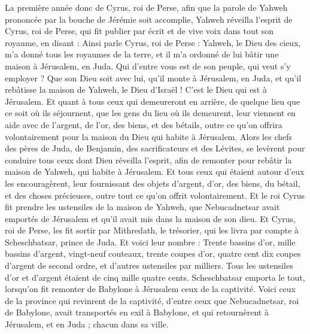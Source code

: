 \begin{multicols}{2}
\VerseOne{}La première année donc de Cyrus, roi de Perse, afin que la parole de Yahweh prononcée par la bouche de Jérémie soit accomplie,  Yahweh réveilla l'esprit de Cyrus, roi de Perse, qui fit publier par écrit et de vive voix dans tout son royaume, en disant :
Ainsi parle Cyrus, roi de Perse : Yahweh, le Dieu des cieux, m'a donné tous les royaumes de la terre, et il m'a ordonné de lui bâtir une maison à Jérusalem, en Juda.
Qui d'entre vous est de son peuple, qui veut s'y employer ? Que son Dieu soit avec lui, qu'il monte à Jérusalem, en Juda, et qu'il rebâtisse la maison de Yahweh, le Dieu d'Israël ! C'est le Dieu qui est à Jérusalem.
Et quant à tous ceux qui demeureront en arrière, de quelque lieu que ce soit où ils séjournent, que les gens du lieu où ils demeurent, leur viennent en aide avec de l'argent, de l’or, des biens, et des bétails, outre ce qu’on offrira volontairement pour la maison du Dieu qui habite à Jérusalem.
Alors les chefs des pères de Juda, de Benjamin, des sacrificateurs et des Lévites, se levèrent pour conduire tous ceux dont Dieu réveilla l’esprit, afin de remonter pour rebâtir la maison de Yahweh, qui habite à Jérusalem.
Et tous ceux qui étaient autour d'eux les encouragèrent, leur fournissant des objets d'argent, d'or, des biens, du bétail, et des choses précieuses, outre tout ce qu’on offrit volontairement.
Et le roi Cyrus fit prendre les ustensiles de la maison de Yahweh, que Nebucadnetsar avait emportés de Jérusalem et qu'il avait mis dans la maison de son dieu.
Et Cyrus, roi de Perse, les fit sortir par Mithredath, le trésorier, qui les livra par compte à Scheschbatsar, prince de Juda.
Et voici leur nombre : Trente bassins d'or, mille bassins d'argent, vingt-neuf couteaux,
trente coupes d'or, quatre cent dix coupes d'argent de second ordre, et d'autres ustensiles par milliers.
Tous les ustensiles d'or et d'argent étaient de cinq mille quatre cents. Scheschbatsar emporta le tout, lorsqu’on fit remonter de Babylone à Jérusalem ceux de la captivité.
\VerseOne{}Voici ceux de la province qui revinrent de la captivité, d'entre ceux que Nebucadnetsar, roi de Babylone, avait transportés en exil à Babylone, et qui retournèrent à Jérusalem, et en Juda ; chacun dans sa ville.

\end{multicols}
